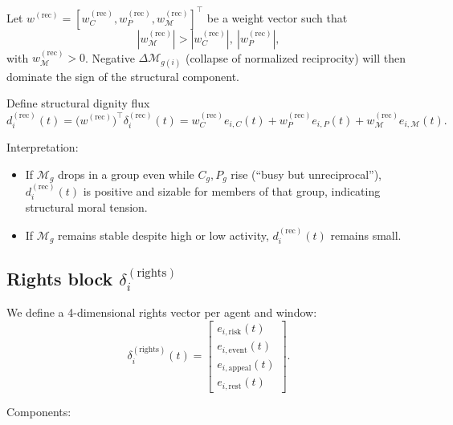 \documentclass[11pt]{article}
\begin{document}
Let \(w^{(\text{rec})} = [w_C^{(\text{rec})}, w_P^{(\text{rec})}, w_{\mathcal{M}}^{(\text{rec})}]^\top\) be a weight vector such that
\[
|w_{\mathcal{M}}^{(\text{rec})}| > |w_C^{(\text{rec})}|,\ |w_P^{(\text{rec})}|,
\]
with \(w_{\mathcal{M}}^{(\text{rec})} > 0\).
Negative \(\Delta \mathcal{M}_{g(i)}\) (collapse of normalized reciprocity) will then dominate the sign of the structural component.

Define structural dignity flux
\[
d_i^{(\text{rec})}(t) = \big(w^{(\text{rec})}\big)^\top \delta_i^{(\text{rec})}(t)
= w_C^{(\text{rec})} e_{i,C}(t) + w_P^{(\text{rec})} e_{i,P}(t) + w_{\mathcal{M}}^{(\text{rec})} e_{i,\mathcal{M}}(t).
\]

Interpretation:
\begin{itemize}[leftmargin=*]
  \item If \(\mathcal{M}_g\) drops in a group even while \(C_g, P_g\) rise (``busy but unreciprocal''), \(d_i^{(\text{rec})}(t)\) is positive and sizable for members of that group, indicating structural moral tension.
  \item If \(\mathcal{M}_g\) remains stable despite high or low activity, \(d_i^{(\text{rec})}(t)\) remains small.
\end{itemize}

\subsection{Rights block \texorpdfstring{\(\delta_i^{(\text{rights})}\)}{delta\_i\^rights}}

We define a 4-dimensional rights vector per agent and window:
\[
\delta_i^{(\text{rights})}(t) =
\begin{bmatrix}
e_{i,\text{risk}}(t) \\
e_{i,\text{event}}(t) \\
e_{i,\text{appeal}}(t) \\
e_{i,\text{rest}}(t)
\end{bmatrix}.
\]

Components:
\end{document}
